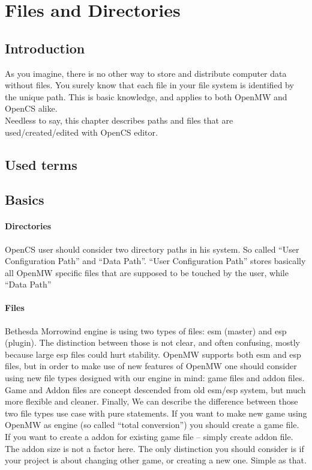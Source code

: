 \section{Files and Directories}
\subsection{Introduction}
As you imagine, there is no other way to store and distribute computer data without files. You surely know that each file in your file system is identified by the unique path. This is basic knowledge, and applies to both Open{MW} and Open{CS} alike.\\

Needless to say, this chapter describes paths and files that are used/created/edited with OpenCS editor.\\

\subsection{Used terms} %

\subsection{Basics}

\paragraph{Directories}
Open{CS} user should consider two directory paths in his system. So called ``User Configuration Path'' and ``Data Path''. ``User Configuration Path'' stores basically all Open{MW} specific files that are supposed to be touched by the user, while ``Data Path''%

\paragraph{Files}
Bethesda Morrowind engine is using two types of files: esm (master) and esp (plugin). The distinction between those is not clear, and often confusing, mostly because large esp files could hurt stability. Open{MW} supports both esm and esp files, but in order to make use of new features of OpenMW one should consider using new file types designed with our engine in mind: game files and addon files.\\

Game and Addon files are concept descended from old esm/esp system, but much more flexible and cleaner. Finally, We can describe the difference between those two file types use case with pure statements. If you want to make new game using Open{MW} as engine (so called ``total conversion'') you should create a game file. If you want to create a addon for existing game file -- simply create addon file. The addon size is not a factor here. The only distinction you should consider is if your project is about changing other game, or creating a new one. Simple as that.

